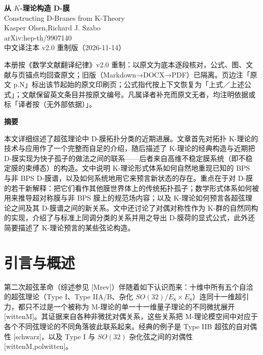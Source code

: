 \documentclass[11pt,a4paper]{ctexart}
\newcommand{\SrcRange}[2]{\marginpar{\raggedright\footnotesize 原文 p.#1}}
\begin{document}
\begin{center}
{\LARGE\bfseries 从 $K$-理论构造 D-膜}\\[6pt]
{\large Constructing D-Branes from K-Theory}\\[6pt]
Kasper Olsen,\quad Richard J. Szabo\\[2pt]
{\small arXiv:hep-th/9907140}\\[8pt]
{\small 中文译注本 v2.0 重制版（2026-11-14）}
\end{center}
\vspace{0.5em}
 本册按《数学文献翻译纪律》v2.0 重制：以原文为底本逐段核对，公式、图、文献与页锚点均回查原文；旧版（Markdown→DOCX→PDF）已隔离。页边注「原文 p.N」标出该节起始的原文印刷页；公式指代按上下文恢复为「上式／上述公式」；文献保留英文条目并按原文编号。凡属译者补充而原文无者，均注明依据或标「译者按（无外部依据）」。
\vspace{0.8em}

\providecommand{\tightlist}{\setlength{\itemsep}{0pt}\setlength{\parskip}{0pt}}
\textbf{摘要}

本文详细综述了超弦理论中 D-膜拓扑分类的近期进展。文章首先对拓扑 K-理论的技术与应用作了一个完整而自足的介绍，随后描述了 K-理论的经典构造与近期把 D-膜实现为快子孤子的做法之间的联系------后者来自高维不稳定膜系统（即不稳定膜的束缚态）的构造。文中说明 K-理论形式体系如何自然地重现已知的 BPS 与非 BPS D-膜谱，以及如何系统地用它来预言新状态的存在。重点在于对 D-膜的若干新解释：把它们看作其他膜世界体上的传统拓扑孤子；数学形式体系如何被用来推导超对称膜与非 BPS 膜上的规范场内容；以及 K-理论如何预言各超弦理论之间及其 D-膜谱之间的新关系。文中还讨论了对偶对称性作为 K-群的自然同构的实现，介绍了与标准上同调分类的关系并用之导出 D-膜荷的显式公式，此外还简要描述了 K-理论预言的某些弦论构造。

\SrcRange{3}{3}
\section{引言与概述}\label{ux5f15ux8a00ux4e0eux6982ux8ff0}

第二次超弦革命（综述参见 [Mrev]）伴随着如下认识而来：十维中所有五个自洽的超弦理论（Type I、Type IIA/B、杂化 \(SO(32)\)/\(E_8 \times E_8\)）连同十一维超引力，都只不过是一个被称为 M-理论的单一十一维量子理论的不同微扰展开 [wittenM]。其证据来自各种非微扰对偶关系，这些关系把 M-理论模空间中对应于各个不同弦理论的不同角落彼此联系起来。经典的例子是 Type IIB 超弦的自对偶性 [schwarz]，以及 Type I 与 \(SO(32)\) 杂化弦之间的对偶性 [wittenM,polwitten]。
\end{document}
